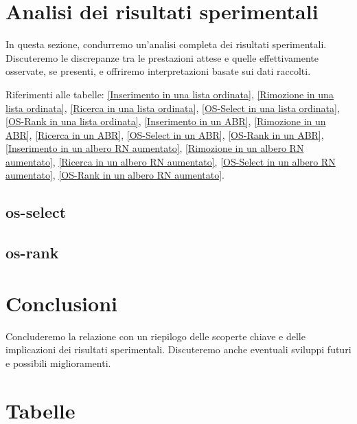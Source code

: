 \documentclass[onecolumn]{article}
\begin{document}
\newpage
\section{Analisi dei risultati sperimentali}

In questa sezione, condurremo un'analisi completa dei risultati sperimentali. Discuteremo le discrepanze tra le prestazioni attese e quelle effettivamente osservate, se presenti, e offriremo interpretazioni basate sui dati raccolti. 

Riferimenti alle tabelle: \ref{Inserimento in una lista ordinata}, \ref{Rimozione in una lista ordinata}, \ref{Ricerca in una lista ordinata}, \ref{OS-Select in una lista ordinata}, \ref{OS-Rank in una lista ordinata}, \ref{Inserimento in un ABR}, \ref{Rimozione in un ABR}, \ref{Ricerca in un ABR}, \ref{OS-Select in un ABR}, \ref{OS-Rank in un ABR}, \ref{Inserimento in un albero RN aumentato}, \ref{Rimozione in un albero RN aumentato}, \ref{Ricerca in un albero RN aumentato}, \ref{OS-Select in un albero RN aumentato}, \ref{OS-Rank in un albero RN aumentato}.

\subsection{os-select}

\subsection{os-rank}

\section{Conclusioni}

Concluderemo la relazione con un riepilogo delle scoperte chiave e delle implicazioni dei risultati sperimentali. Discuteremo anche eventuali sviluppi futuri e possibili miglioramenti.

\newpage
\section{Tabelle}



\end{document}
